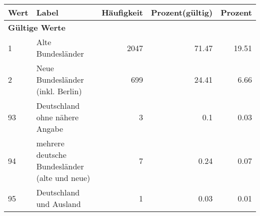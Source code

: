      \begin{longtable}{lXrrr}
     \toprule
     \textbf{Wert} & \textbf{Label} & \textbf{Häufigkeit} & \textbf{Prozent(gültig)} & \textbf{Prozent} \\
     \endhead
     \midrule
     \multicolumn{5}{l}{\textbf{Gültige Werte}}\\

     1 &
     \multicolumn{1}{X}{ Alte Bundesländer   } &


       \num{2047} &
       \num[round-mode=places,round-precision=2]{71,47} &
         \num[round-mode=places,round-precision=2]{19,51} \\

     2 &
     \multicolumn{1}{X}{ Neue Bundesländer (inkl. Berlin)   } &


       \num{699} &
       \num[round-mode=places,round-precision=2]{24,41} &
         \num[round-mode=places,round-precision=2]{6,66} \\

     93 &
     \multicolumn{1}{X}{ Deutschland ohne nähere Angabe   } &


       \num{3} &
       \num[round-mode=places,round-precision=2]{0,1} &
         \num[round-mode=places,round-precision=2]{0,03} \\

     94 &
     \multicolumn{1}{X}{ mehrere deutsche Bundesländer (alte und neue)   } &


       \num{7} &
       \num[round-mode=places,round-precision=2]{0,24} &
         \num[round-mode=places,round-precision=2]{0,07} \\

     95 &
     \multicolumn{1}{X}{ Deutschland und Ausland   } &


       \num{1} &
       \num[round-mode=places,round-precision=2]{0,03} &
         \num[round-mode=places,round-precision=2]{0,01} \\


\end{longtable}
